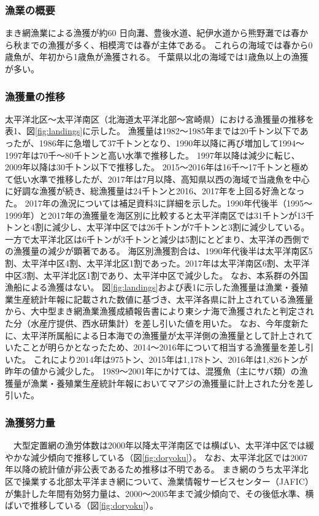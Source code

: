 \subsubsection{漁業の概要} 
まき網漁業による漁獲が約60%
日向灘、豊後水道、紀伊水道から熊野灘では春から秋までの漁獲が多く、相模湾では春が主体である。
これらの海域では春から0歳魚が、年初から1歳魚が漁獲される。
千葉県以北の海域では1歳魚以上の漁獲が多い。

\subsubsection{漁獲量の推移}
太平洋北区～太平洋南区（北海道太平洋北部～宮崎県）における漁獲量の推移を表1、図\ref{fig:landings}に示した。
漁獲量は1982～1985年までは20千トン以下であったが、1986年に急増して37千トンとなり、1990年以降に再び増加して1994～1997年は70千～80千トンと高い水準で推移した。
1997年以降は減少に転じ、2009年以降は30千トン以下で推移した。
2015～2016年は16千～17千トンと極めて低い水準で推移したが、2017年は7月以降、高知県以西の海域で当歳魚を中心に好調な漁獲が続き、総漁獲量は24千トンと2016、2017年を上回る好漁となった。
2017年の漁況については補足資料3に詳細を示した。1990年代後半（1995～1999年）と2017年の漁獲量を海区別に比較すると太平洋南区では31千トンが13千トンと4割に減少し、太平洋中区では26千トンが7千トンと3割に減少している。
一方で太平洋北区は6千トンが3千トンと減少は5割にとどまり、太平洋の西側での漁獲量の減少が顕著である。
海区別漁獲割合は、1990年代後半は太平洋南区5割、太平洋中区4割、太平洋北区1割であった。2017年は太平洋南区6割、太平洋中区3割、太平洋北区1割であり、太平洋中区で減少した。
なお、本系群の外国漁船による漁獲はない。
図\ref{fig:landings}および表1に示した漁獲量は漁業・養殖業生産統計年報に記載された数値に基づき、太平洋各県に計上されている漁獲量から、大中型まき網漁業漁獲成績報告書により東シナ海で漁獲されたと判定された分（水産庁提供、西水研集計）を差し引いた値を用いた。
なお、今年度新たに、太平洋所属船による日本海での漁獲量が太平洋側の漁獲量として計上されていたことが明らかとなったため、2014～2016年について相当する漁獲量を差し引いた。
これにより2014年は975トン、2015年は1,178トン、2016年は1,826トンが昨年の値から減少した。
1989～2001年にかけては、混獲魚（主にサバ類）の漁獲量が漁業・養殖業生産統計年報においてマアジの漁獲量に計上された分を差し引いた。

\subsubsection{漁獲努力量}
　大型定置網の漁労体数は2000年以降太平洋南区では横ばい、太平洋中区では緩やかな減少傾向で推移している（図\ref{fig:doryoku}）。
なお、太平洋北区では2007年以降の統計値が非公表であるため推移は不明である。
まき網のうち太平洋北区で操業する北部太平洋まき網について、漁業情報サービスセンター（JAFIC）が集計した年間有効努力量は、2000～2005年まで減少傾向で、その後低水準、横ばいで推移している（図\ref{fig:doryoku}）。
